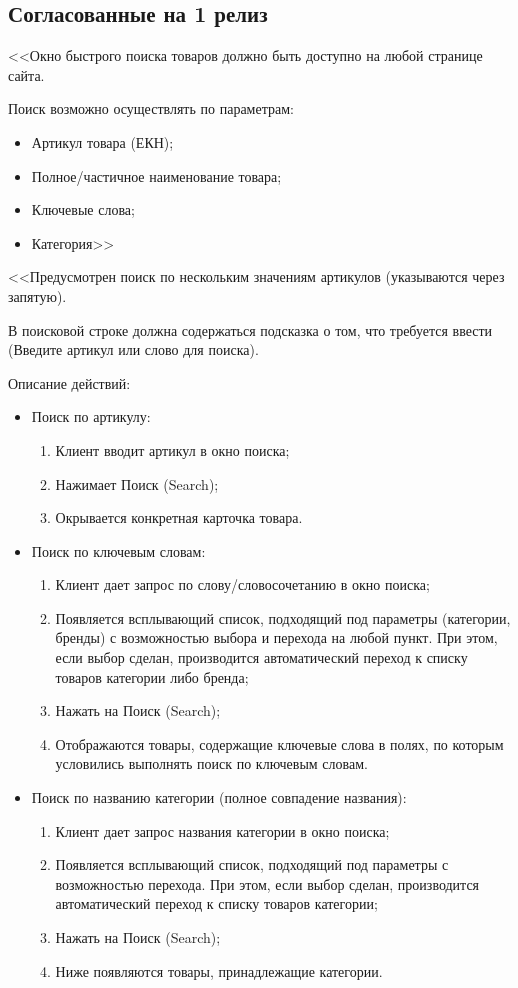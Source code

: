 \subsection{Согласованные на 1 релиз}
{
<<Окно быстрого поиска товаров должно быть доступно на любой странице сайта.

Поиск возможно осуществлять по параметрам:
\begin{itemize}
	\item Артикул товара (ЕКН);
	\item Полное/частичное наименование товара;
	\item Ключевые слова;
	\item Категория>>
\end{itemize}

<<Предусмотрен поиск по нескольким значениям артикулов (указываются через запятую).

В поисковой строке должна содержаться подсказка о том, что требуется ввести (Введите артикул или слово для поиска).

Описание действий:
\begin{itemize}

\item Поиск по артикулу:
	\begin{enumerate} 
		\item Клиент вводит артикул в окно поиска;
		\item Нажимает Поиск (Search);
		\item Окрывается конкретная карточка товара.
	\end{enumerate}	
	
\item Поиск по ключевым словам:
 	\begin{enumerate} 
	 	\item Клиент дает запрос по слову/словосочетанию в окно поиска;
		\item Появляется всплывающий список, подходящий под параметры (категории, бренды) с возможностью выбора и перехода на любой пункт. При этом, если выбор сделан, производится автоматический переход к списку товаров категории либо бренда;
		\item Нажать на Поиск (Search);
		\item Отображаются товары, содержащие ключевые слова в полях, по которым условились выполнять поиск по ключевым словам.
	\end{enumerate}
	
\item Поиск по названию категории (полное совпадение названия):
 	\begin{enumerate} 
 		\item Клиент дает запрос названия категории в окно поиска;
		\item	Появляется всплывающий список, подходящий под параметры с возможностью перехода. При этом, если выбор сделан, производится автоматический переход к списку товаров категории;
		\item	Нажать на Поиск (Search);
		\item	Ниже появляются товары, принадлежащие категории.
	\end{enumerate}	
		

\end{itemize}}
